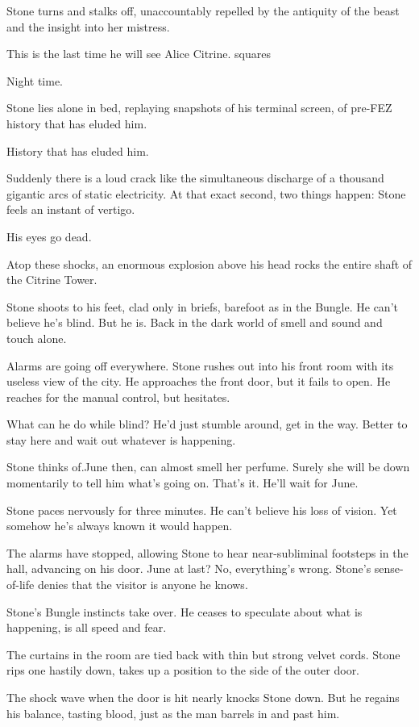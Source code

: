Stone turns and stalks off, unaccountably repelled by the antiquity of the beast and the insight into her mistress.

This is the last time he will see Alice Citrine.
squares

Night time.

Stone lies alone in bed, replaying snapshots of his terminal screen, of pre-FEZ history that has eluded him.

History that has eluded him.

Suddenly there is a loud crack like the simultaneous discharge of a thousand gigantic arcs of static electricity. At that exact second, two things happen: Stone feels an instant of vertigo.

His eyes go dead.

Atop these shocks, an enormous explosion above his head rocks the entire shaft of the Citrine Tower.

Stone shoots to his feet, clad only in briefs, barefoot as in the Bungle. He can’t believe he’s blind. But he is. Back in the dark world of smell and sound and touch alone.

Alarms are going off everywhere. Stone rushes out into his front room with its useless view of the city. He approaches the front door, but it fails to open. He reaches for the manual control, but hesitates.

What can he do while blind? He’d just stumble around, get in the way. Better to stay here and wait out whatever is happening.

Stone thinks of.June then, can almost smell her perfume. Surely she will be down momentarily to tell him what’s going on. That’s it. He’ll wait for June.

Stone paces nervously for three minutes. He can’t believe his loss of vision. Yet somehow he’s always known it would happen.

The alarms have stopped, allowing Stone to hear near-subliminal footsteps in the hall, advancing on his door. June at last? No, everything’s wrong. Stone’s sense-of-life denies that the visitor is anyone he knows.

Stone’s Bungle instincts take over. He ceases to speculate about what is happening, is all speed and fear.

The curtains in the room are tied back with thin but strong velvet cords. Stone rips one hastily down, takes up a position to the side of the outer door.

The shock wave when the door is hit nearly knocks Stone down. But he regains his balance, tasting blood, just as the man barrels in and past him.


